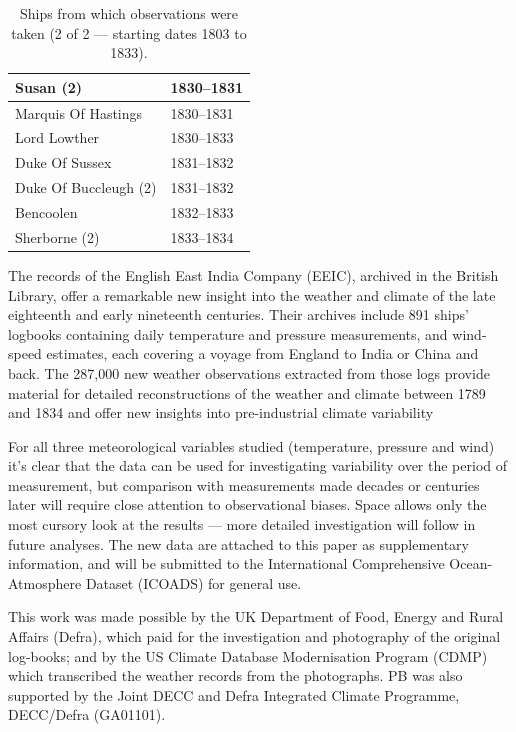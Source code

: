 \documentclass[CP]{copernicus}
\begin{document}
\begin{table}[!hbp]
\begin{minipage}[b]{0.5\linewidth}
{\begin{tabular}{|p{3.5cm}|p{3.5cm}|}
\hline
Susan (2) & 1830--1831\\
\hline
Marquis Of Hastings & 1830--1831\\
\hline
Lord Lowther & 1830--1833\\
\hline
Duke Of Sussex & 1831--1832\\
\hline
Duke Of Buccleugh (2) & 1831--1832\\
\hline
Bencoolen & 1832--1833\\
\hline
Sherborne (2) & 1833--1834\\
\hline
\end{tabular}
}
\end{minipage}
\vspace{0.5cm}
\caption{Ships from which observations were taken (2 of 2 --- starting dates 1803 to 1833).}
\label{T1.2}
\end{table}


\conclusions

The records of the English East India Company (EEIC), archived in the British Library, offer a remarkable new insight into the weather and climate of the late eighteenth and early nineteenth centuries. Their archives include 891 ships' logbooks containing daily temperature and pressure measurements, and wind-speed estimates, each covering a voyage from England to India or China and back. The 287,000 new weather observations extracted from those logs provide material for detailed reconstructions of the weather and climate between 1789 and 1834 and offer new insights into pre-industrial climate variability

For all three meteorological variables studied (temperature, pressure and wind) it's clear that the data can be used for investigating variability over the period of measurement, but comparison with measurements made decades or centuries later will require close attention to observational biases. Space allows only the most cursory look at the results --- more detailed investigation will follow in future analyses. The new data are attached to this paper as supplementary information, and will be submitted to the International Comprehensive Ocean-Atmosphere Dataset (ICOADS) for general use.

\begin{acknowledgement}
This work was made possible by the UK Department of Food, Energy and Rural Affairs (Defra), which paid for the investigation and photography of the original log-books; and by the US Climate Database Modernisation Program (CDMP) which transcribed the weather records from the photographs. PB was also supported by the Joint DECC and Defra Integrated Climate Programme, DECC/Defra (GA01101). 
\end{acknowledgement}



\end{document}
